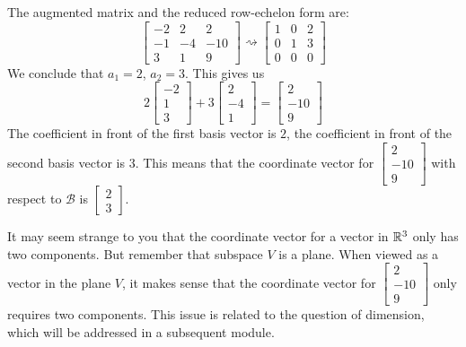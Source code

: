 \documentclass{ximera}
\begin{document}
\begin{example}
\begin{explanation}
 The augmented matrix and the reduced row-echelon form are:
 $$\left[\begin{array}{cc|c}  
 -2&2&2\\-1&-4&-10\\3&1&9
 \end{array}\right]\rightsquigarrow\left[\begin{array}{cc|c}  
 1&0&2\\0&1&3\\0&0&0
 \end{array}\right]$$
 We conclude that $a_1=2$, $a_2=3$.  This gives us
 $$2\begin{bmatrix}-2\\1\\3\end{bmatrix}+3\begin{bmatrix}2\\-4\\1\end{bmatrix}=\begin{bmatrix}2\\-10\\9\end{bmatrix}$$
 The coefficient in front of the first basis vector is $2$, the coefficient in front of the second basis vector is $3$.  This means that the coordinate vector for $\begin{bmatrix}2\\-10\\9\end{bmatrix}$ with respect to $\mathcal{B}$ is $\begin{bmatrix}2\\3\end{bmatrix}$.
 
 It may seem strange to you that the coordinate vector for a vector in $\mathbb{R}^3$ only has two components.  But remember that subspace $V$ is a plane.  When viewed as a vector in the plane $V$, it  makes sense that the coordinate vector for $\begin{bmatrix}2\\-10\\9\end{bmatrix}$ only requires two components.  This issue is related to the question of dimension, which will be addressed in a subsequent module.
\end{explanation}
\end{example}
\end{document}

